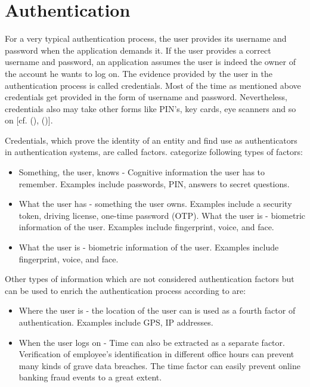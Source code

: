 \section{Authentication}
For a very typical authentication process, the user provides its username and password when the application demands it. If the user provides a correct username and password, an application assumes the user is indeed the owner of the account he wants to log on. The evidence provided by the user in the authentication process is called credentials. Most of the time as mentioned above credentials get provided in the form of username and password. Nevertheless, credentials also may take other forms like PIN’s, key cards, eye scanners and so on [cf. (\cite{Todorov:2007:MUI}), (\cite{Boyd:2012:GSOAuth})]. 

Credentials, which prove the identity of an entity and find use as authenticators in authentication systems, are called factors. \cite{NIST:2017:DIG} categorize following types of factors:

\begin{itemize}  
	\item Something, the user, knows - Cognitive information the user has to remember. Examples include passwords, PIN, answers to secret questions.
	\item What the user has - something the user owns. Examples include a security token, driving license, one-time password (OTP). 
	What the user is - biometric information of the user. Examples include fingerprint, voice, and face.  
	\item What the user is - biometric information of the user. Examples include fingerprint, voice, and face. 
\end{itemize}

Other types of information which are not considered authentication factors but  can be used to enrich the authentication process according to \cite{Dasgupta:2017:AUA} are:

\begin{itemize}
	\item Where the user is - the location of the user can is used as a fourth factor of authentication. Examples include GPS, IP addresses.
	\item When the user logs on - Time can also be extracted as a separate factor. Verification of employee’s identification in different office hours can prevent many kinds of grave data breaches. The time factor can easily prevent online banking fraud events to a great extent. 
\end{itemize}

